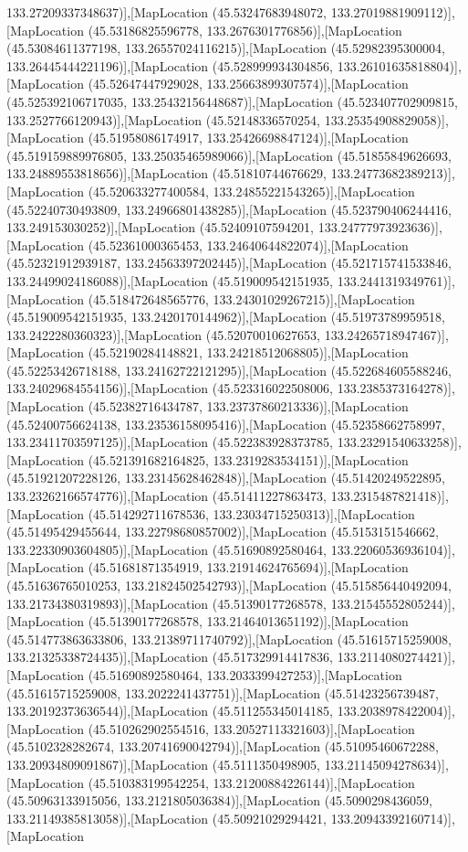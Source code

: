 133.27209337348637)],[MapLocation (45.53247683948072, 133.27019881909112)],[MapLocation (45.53186825596778, 133.2676301776856)],[MapLocation (45.53084611377198, 133.26557024116215)],[MapLocation (45.52982395300004, 133.26445444221196)],[MapLocation (45.528999934304856, 133.26101635818804)],[MapLocation (45.52647447929028, 133.25663899307574)],[MapLocation (45.525392106717035, 133.25432156448687)],[MapLocation (45.523407702909815, 133.2527766120943)],[MapLocation (45.52148336570254, 133.25354908829058)],[MapLocation (45.51958086174917, 133.25426698847124)],[MapLocation (45.519159889976805, 133.25035465989066)],[MapLocation (45.51855849626693, 133.24889553818656)],[MapLocation (45.51810744676629, 133.24773682389213)],[MapLocation (45.520633277400584, 133.24855221543265)],[MapLocation (45.52240730493809, 133.24966801438285)],[MapLocation (45.523790406244416, 133.249153030252)],[MapLocation (45.52409107594201, 133.24777973923636)],[MapLocation (45.52361000365453, 133.24640644822074)],[MapLocation (45.52321912939187, 133.24563397202445)],[MapLocation (45.521715741533846, 133.24499024186088)],[MapLocation (45.519009542151935, 133.2441319349761)],[MapLocation (45.518472648565776, 133.24301029267215)],[MapLocation (45.519009542151935, 133.2420170144962)],[MapLocation (45.51973789959518, 133.2422280360323)],[MapLocation (45.52070010627653, 133.24265718947467)],[MapLocation (45.52190284148821, 133.24218512068805)],[MapLocation (45.52253426718188, 133.24162722121295)],[MapLocation (45.522684605588246, 133.24029684554156)],[MapLocation (45.523316022508006, 133.2385373164278)],[MapLocation (45.52382716434787, 133.23737860213336)],[MapLocation (45.52400756624138, 133.23536158095416)],[MapLocation (45.52358662758997, 133.23411703597125)],[MapLocation (45.522383928373785, 133.23291540633258)],[MapLocation (45.521391682164825, 133.2319283534151)],[MapLocation (45.51921207228126, 133.23145628462848)],[MapLocation (45.51420249522895, 133.23262166574776)],[MapLocation (45.51411227863473, 133.2315487821418)],[MapLocation (45.514292711678536, 133.23034715250313)],[MapLocation (45.51495429455644, 133.22798680857002)],[MapLocation (45.5153151546662, 133.22330903604805)],[MapLocation (45.51690892580464, 133.22060536936104)],[MapLocation (45.51681871354919, 133.21914624765694)],[MapLocation (45.51636765010253, 133.21824502542793)],[MapLocation (45.515856440492094, 133.21734380319893)],[MapLocation (45.51390177268578, 133.21545552805244)],[MapLocation (45.51390177268578, 133.21464013651192)],[MapLocation (45.514773863633806, 133.21389711740792)],[MapLocation (45.51615715259008, 133.21325338724435)],[MapLocation (45.517329914417836, 133.2114080274421)],[MapLocation (45.51690892580464, 133.2033399427253)],[MapLocation (45.51615715259008, 133.2022241437751)],[MapLocation (45.51423256739487, 133.20192373636544)],[MapLocation (45.511255345014185, 133.2038978422004)],[MapLocation (45.510262902554516, 133.20527113321603)],[MapLocation (45.5102328282674, 133.20741690042794)],[MapLocation (45.51095460672288, 133.20934809091867)],[MapLocation (45.5111350498905, 133.21145094278634)],[MapLocation (45.510383199542254, 133.21200884226144)],[MapLocation (45.50963133915056, 133.2121805036384)],[MapLocation (45.5090298436059, 133.21149385813058)],[MapLocation (45.50921029294421, 133.20943392160714)],[MapLocation 